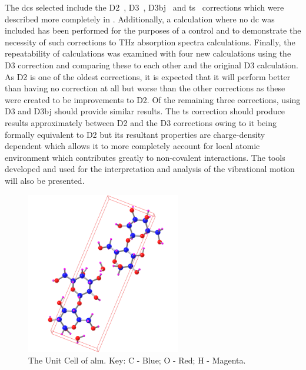 The \acrshort{dc}s selected include the D2~\cite{Grimme2006}, D3~\cite{Grimme2010}, D3\acrshort{bj}~\cite{Becke2005} and \acrshort{ts}~\cite{Tkatchenko2009} corrections which were described more completely in . Additionally, a calculation where no \acrshort{dc} was included has been performed for the purposes of a control and to demonstrate the necessity of such corrections to THz absorption spectra calculations. Finally, the repeatability of calculations was examined with four new calculations using the D3 correction and comparing these to each other and the original D3 calculation. As D2 is one of the oldest corrections, it is expected that it will perform better than having no correction at all but worse than the other corrections as these were created to be improvements to D2. Of the remaining three corrections, using D3 and D3\acrshort{bj} should provide similar results. The \acrshort{ts} correction should produce results approximately between D2 and the D3 corrections owing to it being formally equivalent to D2 but its resultant properties are charge\nobreakdash-density dependent which allows it to more completely account for local atomic environment which contributes greatly to non-covalent interactions. The tools developed and used for the interpretation and analysis of the vibrational motion will also be presented.

\begin{figure}[t]
    \centering
    \includegraphics[width=0.6\textwidth]{Figures/Analysis/IVDW/aLM_struct_UC_2.png}
    \captionsetup{font = footnotesize, justification = centering}
    \caption[The Unit Cell of \(\alpha\)-Lactose Monohydrate]{The Unit Cell of \acrshort{alm}. Key: C - Blue; O - Red; H - Magenta.}
    \label{fig:aLM_Structure}
\end{figure}

